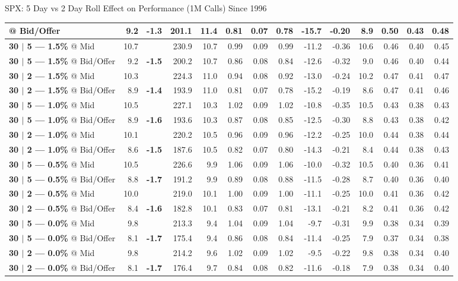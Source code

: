 \documentclass{beamer}
\begin{document}
\begin{frame}{\normalsize SPX: 5 Day vs 2 Day Roll Effect on Performance (1M Calls) Since 1996}
{\begin{tabular}{lrcrrrrrrrrrrr}
\color{blue}{\bf 30 $|$ 2 --- 2.0\%} @ Bid/Offer & 9.2 & {\bf \color{red}-1.3} & 201.1 & 11.4 & 0.81 & 0.07 & 0.78 & -15.7 & -0.20 & 8.9 & 0.50 & 0.43 & 0.48\\
\midrule
{\bf 30 $|$ 5 --- 1.5\%} @ Mid & 10.7 & & 230.9 & 10.7 & 0.99 & 0.09 & 0.99 & -11.2 & -0.36 & 10.6 & 0.46 & 0.40 & 0.45\\
{\bf 30 $|$ 5 --- 1.5\%} @ Bid/Offer & 9.2 & {\bf \color{red}-1.5} & 200.2 & 10.7 & 0.86 & 0.08 & 0.84 & -12.6 & -0.32 & 9.0 & 0.46 & 0.40 & 0.44\\
\addlinespace
{\bf 30 $|$ 2 --- 1.5\%} @ Mid & 10.3 & & 224.3 & 11.0 & 0.94 & 0.08 & 0.92 & -13.0 & -0.24 & 10.2 & 0.47 & 0.41 & 0.47\\
{\bf 30 $|$ 2 --- 1.5\%} @ Bid/Offer & 8.9 & {\bf \color{red}-1.4} & 193.9 & 11.0 & 0.81 & 0.07 & 0.78 & -15.2 & -0.19 & 8.6 & 0.47 & 0.41 & 0.46\\
\midrule
{\bf 30 $|$ 5 --- 1.0\%} @ Mid & 10.5 & & 227.1 & 10.3 & 1.02 & 0.09 & 1.02 & -10.8 & -0.35 & 10.5 & 0.43 & 0.38 & 0.43\\
{\bf 30 $|$ 5 --- 1.0\%} @ Bid/Offer & 8.9 & {\bf \color{red}-1.6} & 193.6 & 10.3 & 0.87 & 0.08 & 0.85 & -12.5 & -0.30 & 8.8 & 0.43 & 0.38 & 0.42\\
\addlinespace
{\bf 30 $|$ 2 --- 1.0\%} @ Mid & 10.1 & & 220.2 & 10.5 & 0.96 & 0.09 & 0.96 & -12.2 & -0.25 & 10.0 & 0.44 & 0.38 & 0.44\\
{\bf 30 $|$ 2 --- 1.0\%} @ Bid/Offer & 8.6 & {\bf \color{red}-1.5} & 187.6 & 10.5 & 0.82 & 0.07 & 0.80 & -14.3 & -0.21 & 8.4 & 0.44 & 0.38 & 0.43\\
\midrule
{\bf 30 $|$ 5 --- 0.5\%} @ Mid & 10.5 & & 226.6 & 9.9 & 1.06 & 0.09 & 1.06 & -10.0 & -0.32 & 10.5 & 0.40 & 0.36 & 0.41\\
{\bf 30 $|$ 5 --- 0.5\%} @ Bid/Offer & 8.8 & {\bf \color{red}-1.7} & 191.2 & 9.9 & 0.89 & 0.08 & 0.88 & -11.5 & -0.28 & 8.7 & 0.40 & 0.36 & 0.40\\
\addlinespace
{\bf 30 $|$ 2 --- 0.5\%} @ Mid & 10.0 & & 219.0 & 10.1 & 1.00 & 0.09 & 1.00 & -11.1 & -0.25 & 10.0 & 0.41 & 0.36 & 0.42\\
{\bf 30 $|$ 2 --- 0.5\%} @ Bid/Offer & 8.4 & {\bf \color{red}-1.6} & 182.8 & 10.1 & 0.83 & 0.07 & 0.81 & -13.1 & -0.21 & 8.2 & 0.41 & 0.36 & 0.42\\
\midrule
{\bf 30 $|$ 5 --- 0.0\%} @ Mid & 9.8 & & 213.3 & 9.4 & 1.04 & 0.09 & 1.04 & -9.7 & -0.31 & 9.9 & 0.38 & 0.34 & 0.39\\
{\bf 30 $|$ 5 --- 0.0\%} @ Bid/Offer & 8.1 & {\bf \color{red}-1.7} & 175.4 & 9.4 & 0.86 & 0.08 & 0.84 & -11.4 & -0.25 & 7.9 & 0.37 & 0.34 & 0.38\\
\addlinespace
{\bf 30 $|$ 2 --- 0.0\%} @ Mid & 9.8 & & 214.2 & 9.6 & 1.02 & 0.09 & 1.02 & -9.5 & -0.22 & 9.8 & 0.38 & 0.34 & 0.40\\
{\bf 30 $|$ 2 --- 0.0\%} @ Bid/Offer & 8.1 & {\bf \color{red}-1.7} & 176.4 & 9.7 & 0.84 & 0.08 & 0.82 & -11.6 & -0.18 & 7.9 & 0.38 & 0.34 & 0.40\\
\bottomrule
\bottomrule
\end{tabular}
}


\end{frame}
\end{document}
